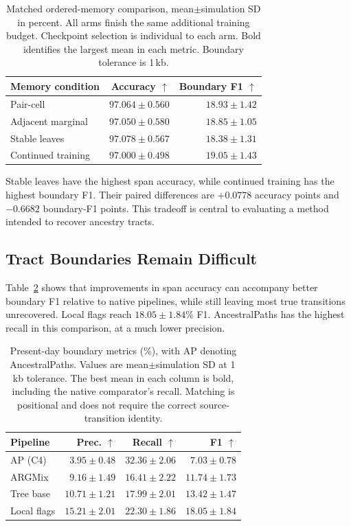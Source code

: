 \documentclass[letterpaper]{article}
\newcommand{\best}[1]{\mathbf{#1}}
\begin{document}
\begin{table}[t]
\centering
\small
\begin{tabular}{@{}lrr@{}}
\toprule
Memory condition & Accuracy $\uparrow$ & Boundary F1 $\uparrow$\\
\midrule
Pair-cell & $97.064\pm0.560$ & $18.93\pm1.42$\\
Adjacent marginal & $97.050\pm0.580$ & $18.85\pm1.05$\\
Stable leaves & $\best{97.078\pm0.567}$ & $18.38\pm1.31$\\
Continued training & $97.000\pm0.498$ & $\best{19.05\pm1.43}$\\
\bottomrule
\end{tabular}
\caption{Matched ordered-memory comparison, mean$\pm$simulation SD in percent. All arms finish the same additional training budget. Checkpoint selection is individual to each arm. Bold identifies the largest mean in each metric. Boundary tolerance is 1\,kb.}
\label{tab:memory}
\end{table}

Stable leaves have the highest span accuracy, while continued training has the highest boundary F1. Their paired differences are $+0.0778$ accuracy points and $-0.6682$ boundary-F1 points. This tradeoff is central to evaluating a method intended to recover ancestry tracts.

\subsection{Tract Boundaries Remain Difficult}
Table~\ref{tab:boundaries} shows that improvements in span accuracy can accompany better boundary F1 relative to native pipelines, while still leaving most true transitions unrecovered. Local flags reach $18.05\pm1.84\%$ F1. AncestralPaths has the highest recall in this comparison, at a much lower precision.

\begin{table}[t]
\centering
\small
\begin{tabular}{@{}lrrr@{}}
\toprule
Pipeline & Prec. $\uparrow$ & Recall $\uparrow$ & F1 $\uparrow$\\
\midrule
AP (C4)&$3.95\pm0.48$&$\best{32.36\pm2.06}$&$7.03\pm0.78$\\
ARGMix&$9.16\pm1.49$&$16.41\pm2.22$&$11.74\pm1.73$\\
Tree base&$10.71\pm1.21$&$17.99\pm2.01$&$13.42\pm1.47$\\
Local flags&$\best{15.21\pm2.01}$&$22.30\pm1.86$&$\best{18.05\pm1.84}$\\
\bottomrule
\end{tabular}
\caption{Present-day boundary metrics (\%), with AP denoting AncestralPaths. Values are mean$\pm$simulation SD at 1\,kb tolerance. The best mean in each column is bold, including the native comparator's recall. Matching is positional and does not require the correct source-transition identity.}
\label{tab:boundaries}
\end{table}
\end{document}
